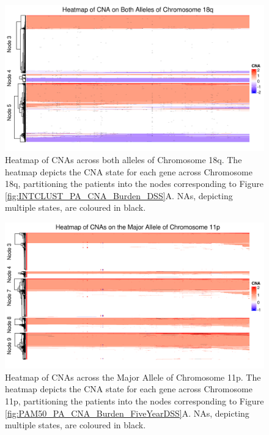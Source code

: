 \begin{figure}[!htb]
\centering
\includegraphics[width = 1\textwidth]{../figures/Chapter_6/Heatmap_Chr18q_Genes_Both_Alleles.png}
\caption[Heatmap of CNAs across both alleles of Chromosome 18q.]{Heatmap of CNAs across both alleles of Chromosome 18q. The heatmap depicts the CNA state for each gene across Chromosome 18q, partitioning the patients into the nodes corresponding to Figure \ref{fig:INTCLUST_PA_CNA_Burden_DSS}A. NAs, depicting multiple states, are coloured in black.}
\label{fig:heatmap_Both_18q}
\end{figure}

\begin{figure}[!htb]
\centering
\includegraphics[width = 1\textwidth]{../figures/Chapter_6/Heatmap_Chr11p_Genes_Major.png}
\caption[Heatmap of CNAs across the Major Allele of Chromosome 11p.]{Heatmap of CNAs across the Major Allele of Chromosome 11p. The heatmap depicts the CNA state for each gene across Chromosome 11p, partitioning the patients into the nodes corresponding to Figure \ref{fig:PAM50_PA_CNA_Burden_FiveYearDSS}A. NAs, depicting multiple states, are coloured in black.}
\label{fig:heatmap_Major_11p}
\end{figure}

